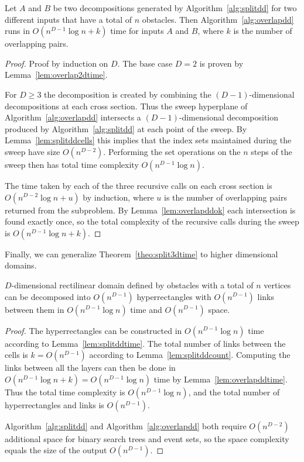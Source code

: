 \documentclass[english,gradu]{tktltiki2018}
\begin{document}
\begin{lem}\label{lem:overlapddtime}
Let $A$ and $B$ be two decompositions generated by Algorithm~\ref{alg:splitdd} for two different inputs that have a total of $n$ obstacles.
Then Algorithm~\ref{alg:overlapdd} runs in $O(n^{D-1}\log n + k)$ time for inputs $A$ and $B$, where $k$ is the number of overlapping pairs.
\end{lem}
\begin{proof}
Proof by induction on $D$.
The base case $D=2$ is proven by Lemma~\ref{lem:overlap2dtime}.

For $D\ge 3$ the decomposition is created by combining the $(D-1)$-dimensional decompositions at each cross section.
Thus the sweep hyperplane of Algorithm~\ref{alg:overlapdd} intersects a $(D-1)$-dimensional decomposition produced by Algorithm~\ref{alg:splitdd} at each point of the sweep.
By Lemma~\ref{lem:splitddcells} this implies that the index sets maintained during the sweep have size $O(n^{D-2})$.
Performing the set operations on the $n$ steps of the sweep then has total time complexity $O(n^{D-1}\log n)$.

The time taken by each of the three recursive calls on each cross section is $O(n^{D-2}\log n + u)$ by induction, where $u$ is the number of overlapping pairs returned from the subproblem.
By Lemma~\ref{lem:overlapddok} each intersection is found exactly once, so the total complexity of the recursive calls during the sweep is $O(n^{D-1}\log n + k)$.
\end{proof}

Finally, we can generalize Theorem~\ref{theo:split3dtime} to higher dimensional domains.

\begin{theo}\label{theo:splitddtime}$D$-dimensional rectilinear domain defined by obstacles with a total of $n$ vertices can be decomposed into $O(n^{D-1})$ hyperrectangles with $O(n^{D-1})$ links between them in $O(n^{D-1}\log n)$ time and $O(n^{D-1})$ space.\end{theo}
\begin{proof}
The hyperrectangles can be constructed in $O(n^{D-1}\log n)$ time according to Lemma~\ref{lem:splitddtime}.
The total number of links between the cells is $k=O(n^{D-1})$ according to Lemma~\ref{lem:splitddcount}.
Computing the links between all the layers can then be done in $O(n^{D-1}\log n+k)=O(n^{D-1}\log n)$ time by Lemma~\ref{lem:overlapddtime}.
Thus the total time complexity is $O(n^{D-1}\log n)$, and the total number of hyperrectangles and links is $O(n^{D-1})$.

Algorithm~\ref{alg:splitdd} and Algorithm~\ref{alg:overlapdd} both require $O(n^{D-2})$ additional space for binary search trees and event sets, so the space complexity equals the size of the output $O(n^{D-1})$.
\end{proof}
\end{document}
